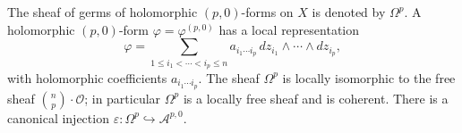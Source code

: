 The sheaf of germs of holomorphic $(p,0)$-forms on $X$ is denoted by $\Omega^p$. A holomorphic $(p,0)$-form $\varphi = \varphi^{(p,0)}$ has a local representation
$$
\varphi = \sum_{1 \leqslant i_1 < \cdots < i_p \leqslant n} a_{i_1 \cdots i_p} \, dz_{i_1} \wedge \cdots \wedge dz_{i_p},
$$
with holomorphic coefficients $a_{i_1 \cdots i_p}$. The sheaf $\Omega^p$ is locally isomorphic to the free sheaf $\binom{n}{p} \cdot \mathcal{O}$; in particular $\Omega^p$ is a locally free sheaf and is coherent. There is a canonical injection $\varepsilon: \Omega^p \hookrightarrow \mathcal{A}^{p,0}$.

